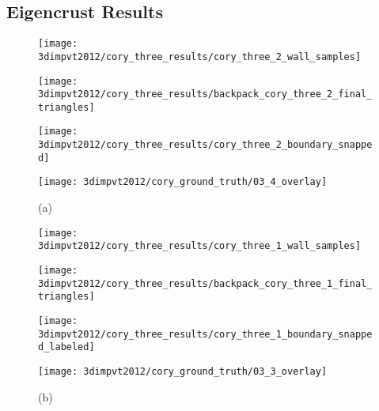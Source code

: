 \documentclass[12pt,onecolumn,oneside]{book}
\begin{document}
\subsection{Eigencrust Results}
\label{ssec:eigencrust_results}


\begin{figure}[p]

\centering
\begin{minipage}[b]{0.24\linewidth}
  \centering
  \centerline{\texttt{[image: 3dimpvt2012/cory\_three\_results/cory\_three\_2\_wall\_samples]}}
\end{minipage}
\hfill
\begin{minipage}[b]{0.24\linewidth}
  \centering
  \centerline{\texttt{[image: 3dimpvt2012/cory\_three\_results/backpack\_cory\_three\_2\_final\_triangles]}}
\end{minipage}
\hfill
\begin{minipage}[b]{0.24\linewidth}
  \centering
  \centerline{\texttt{[image: 3dimpvt2012/cory\_three\_results/cory\_three\_2\_boundary\_snapped]}}
\end{minipage}
\hfill
\begin{minipage}[b]{0.24\linewidth}
  \centering
  \centerline{\texttt{[image: 3dimpvt2012/cory\_ground\_truth/03\_4\_overlay]}}
\end{minipage}
\centerline{(a)}
\linebreak

\begin{minipage}[b]{0.24\linewidth}
  \centering
  \centerline{\texttt{[image: 3dimpvt2012/cory\_three\_results/cory\_three\_1\_wall\_samples]}}
\end{minipage}
\hfill
\begin{minipage}[b]{0.24\linewidth}
  \centering
  \centerline{\texttt{[image: 3dimpvt2012/cory\_three\_results/backpack\_cory\_three\_1\_final\_triangles]}}
\end{minipage}
\hfill
\begin{minipage}[b]{0.24\linewidth}
  \centering
  \centerline{\texttt{[image: 3dimpvt2012/cory\_three\_results/cory\_three\_1\_boundary\_snapped\_labeled]}}
\end{minipage}
\hfill
\begin{minipage}[b]{0.24\linewidth}
  \centering
  \centerline{\texttt{[image: 3dimpvt2012/cory\_ground\_truth/03\_3\_overlay]}}
\end{minipage}
\centerline{(b)}
\linebreak


\end{figure}
\end{document}
